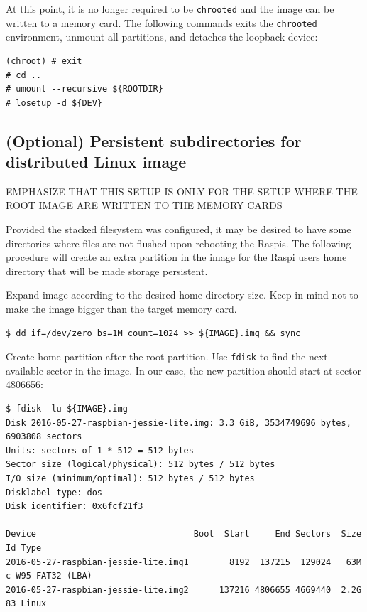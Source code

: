 At this point, it is no longer required to be \texttt{chrooted} and the image
can be written to a memory card. The following commands exits the \texttt{chrooted}
environment, unmount all partitions, and detaches the loopback device:

\begin{lstlisting}[]
(chroot) # exit
# cd ..
# umount --recursive ${ROOTDIR}
# losetup -d ${DEV}
\end{lstlisting}
\FloatBarrier
\vspace{-5mm}

\subsection{(Optional) Persistent subdirectories for distributed Linux image}

EMPHASIZE THAT THIS SETUP IS ONLY FOR THE SETUP WHERE THE ROOT IMAGE ARE
WRITTEN TO THE MEMORY CARDS

Provided the stacked filesystem was configured, it may be desired to have
some directories where files are not flushed upon rebooting the \ac{Raspi}s.
The following procedure will create an extra partition in the image for
the \ac{Raspi} users home directory that will be made storage persistent.

Expand image according to the desired home directory size. Keep in mind not
to make the image bigger than the target memory card.
\begin{lstlisting}[]
$ dd if=/dev/zero bs=1M count=1024 >> ${IMAGE}.img && sync
\end{lstlisting}
\FloatBarrier
\vspace{-5mm}

Create home partition after the root partition. Use \texttt{fdisk} to
find the next available sector in the image. In our case, the new
partition should start at sector 4806656:
\begin{lstlisting}[]
$ fdisk -lu ${IMAGE}.img
Disk 2016-05-27-raspbian-jessie-lite.img: 3.3 GiB, 3534749696 bytes, 6903808 sectors
Units: sectors of 1 * 512 = 512 bytes
Sector size (logical/physical): 512 bytes / 512 bytes
I/O size (minimum/optimal): 512 bytes / 512 bytes
Disklabel type: dos
Disk identifier: 0x6fcf21f3

Device                               Boot  Start     End Sectors  Size Id Type
2016-05-27-raspbian-jessie-lite.img1        8192  137215  129024   63M  c W95 FAT32 (LBA)
2016-05-27-raspbian-jessie-lite.img2      137216 4806655 4669440  2.2G 83 Linux
\end{lstlisting}
\FloatBarrier
\vspace{-5mm}


